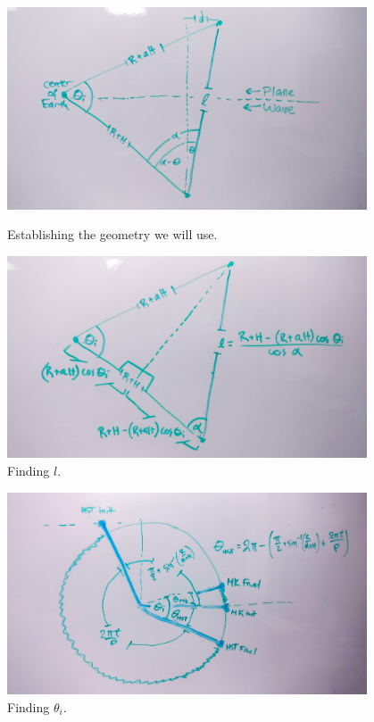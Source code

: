 \documentclass[12pt]{article}
\begin{document}
\begin{onehalfspacing}
\begin{figure}
    \centering
    \begin{minipage}{0.48\textwidth}
        \centering
        \includegraphics[width=0.95\textwidth]{prob2b-1} %
        \caption{Establishing the geometry we will use.}
    \end{minipage}\hfill
    \begin{minipage}{0.48\textwidth}
        \centering
        \includegraphics[width=0.95\textwidth]{prob2b-2} %
        \caption{Finding $l$.}
    \end{minipage}
\end{figure}

\begin{figure}
    \centering
    \begin{minipage}{0.48\textwidth}
        \centering
        \includegraphics[width=0.95\textwidth]{prob2b-3} %
        \caption{Finding $\theta_i$.}
    \end{minipage}
\end{figure}






\bigskip
\bigskip
\end{onehalfspacing}
\end{document}
